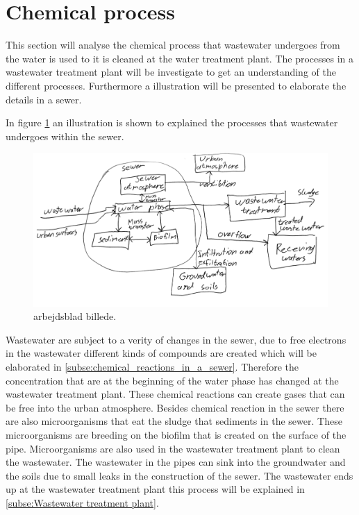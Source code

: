 \section{Chemical process}\label{se:chemical_process}
This section will analyse the chemical process that wastewater undergoes from the water is used to it is cleaned at the water treatment plant. The processes in a wastewater treatment plant will be investigate to get an understanding of the different processes. Furthermore a illustration will be presented to elaborate the details in a sewer. 

In figure \ref{fig:sewer_overview_of_the_different_parts} an illustration is shown to explained the processes that wastewater undergoes within the sewer.
\begin{figure}[H]
\centering
\includegraphics[width=1\textwidth]{report/introduction/pictures/detailed_sewer.pdf}
\caption{arbejdsblad billede. }
\label{fig:sewer_overview_of_the_different_parts}
\end{figure}
Wastewater are subject to a verity of changes in the sewer, due to free electrons in the wastewater different kinds of compounds are created which will be elaborated in \ref{subse:chemical_reactions_in_a_sewer}. Therefore the concentration that are at the beginning of the water phase has changed at the wastewater treatment plant. These chemical reactions can create gases that can be free into the urban atmosphere. Besides chemical reaction in the sewer there are also microorganisms that eat the sludge that sediments in the sewer. These microorganisms are breeding on the biofilm that is created on the surface of the pipe. Microorganisms are also used in the wastewater treatment plant to clean the wastewater. The wastewater in the pipes can sink into the groundwater and the soils due to small leaks in the construction of the sewer. The wastewater ends up at the wastewater treatment plant this process will be explained in \ref{subse:Wastewater treatment plant}. 


